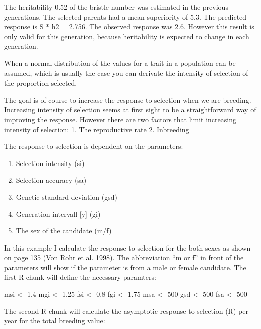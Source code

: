 \documentclass[]{article}
\newenvironment{Shaded}{\begin{snugshade}}{\end{snugshade}}
\newcommand{\DecValTok}[1]{\textcolor[rgb]{0.00,0.00,0.81}{#1}}
\newcommand{\FloatTok}[1]{\textcolor[rgb]{0.00,0.00,0.81}{#1}}
\newcommand{\StringTok}[1]{\textcolor[rgb]{0.31,0.60,0.02}{#1}}
\newcommand{\NormalTok}[1]{#1}
\providecommand{\tightlist}{%
  \setlength{\itemsep}{0pt}\setlength{\parskip}{0pt}}
\begin{document}
The heritability 0.52 of the bristle number was estimated in the
previous generations. The selected parents had a mean superiority of
5.3. The predicted response is S * h2 = 2.756. The observed response was
2.6. However this result is only valid for this generation, because
heritability is expected to change in each generation.

When a normal distribution of the values for a trait in a population can
be assumed, which is usually the case you can derivate the intensity of
selection of the proportion selected.

The goal is of course to increase the response to selection when we are
breeding. Increasing intensity of selection seems at first sight to be a
straightforward way of improving the response. However there are two
factors that limit increasing intensity of selection: 1. The
reproductive rate 2. Inbreeding

The response to selection is dependent on the parameters:

\begin{enumerate}
\def\labelenumi{\arabic{enumi}.}
\tightlist
\item
  Selection intensity (si)
\item
  Selection accuracy (sa)
\item
  Genetic standard deviation (gsd)
\item
  Generation intervall {[}y{]} (gi)
\item
  The sex of the candidate (m/f)
\end{enumerate}

In this example I calculate the response to selection for the both sexes
as shown on page 135 (Von Rohr et al. 1998). The abbreviation ``m or f''
in front of the parameters will show if the parameter is from a male or
female candidate. The first R chunk will define the necessary paramters:

\begin{Shaded}
\begin{Highlighting}[]
\NormalTok{msi <-}\StringTok{ }\FloatTok{1.4}
\NormalTok{mgi <-}\StringTok{ }\FloatTok{1.25}
\NormalTok{fsi <-}\StringTok{ }\FloatTok{0.8}
\NormalTok{fgi <-}\StringTok{ }\FloatTok{1.75}
\NormalTok{msa <-}\StringTok{ }\DecValTok{500}
\NormalTok{gsd <-}\StringTok{ }\DecValTok{500}
\NormalTok{fsa <-}\StringTok{ }\DecValTok{500}
\end{Highlighting}
\end{Shaded}

The second R chunk will calculate the asymptotic response to selection
(R) per year for the total breeding value:
\end{document}

